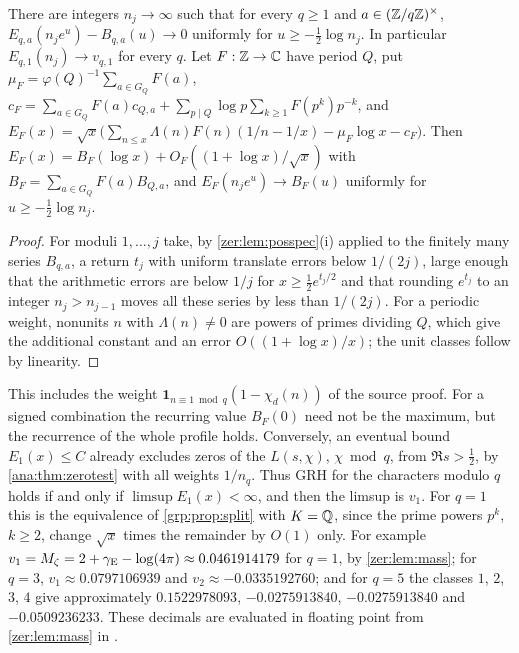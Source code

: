 \begin{theorem}\label{zer:thm:univpeak}
There are integers $n_j\to\infty$ such that for every $q\ge1$ and $a\in(\mathbb{Z}/q\mathbb{Z})^\times$,
$E_{q,a}(n_je^u)-B_{q,a}(u)\to0$ uniformly for $u\ge-\tfrac12\log n_j$. In particular
$E_{q,1}(n_j)\to v_{q,1}$ for every $q$. Let $F:\mathbb{Z}\to\mathbb{C}$ have period $Q$, put
$\mu_F=\varphi(Q)^{-1}\sum_{a\in G_Q}F(a)$,
$c_F=\sum_{a\in G_Q}F(a)c_{Q,a}+\sum_{p\mid Q}\log p\sum_{k\ge1}F(p^k)p^{-k}$, and
$E_F(x)=\sqrt x\bigl(\sum_{n\le x}\Lambda(n)F(n)(1/n-1/x)-\mu_F\log x-c_F\bigr)$. Then
$E_F(x)=B_F(\log x)+O_{F}((1+\log x)/\sqrt x)$ with $B_F=\sum_{a\in G_Q}F(a)B_{Q,a}$, and
$E_F(n_je^u)\to B_F(u)$ uniformly for $u\ge-\tfrac12\log n_j$.
\end{theorem}
\begin{proof}
For moduli $1,\dots,j$ take, by \cref{zer:lem:posspec}(i) applied to the finitely many series
$B_{q,a}$, a return $t_j$ with uniform translate errors below $1/(2j)$, large enough that the
arithmetic errors are below $1/j$ for $x\ge\tfrac12e^{t_j/2}$ and that rounding $e^{t_j}$ to an
integer $n_j>n_{j-1}$ moves all these series by less than $1/(2j)$. For a periodic weight,
nonunits $n$ with $\Lambda(n)\ne0$ are powers of primes dividing $Q$, which give the additional
constant and an error $O((1+\log x)/x)$; the unit classes follow by linearity.
\end{proof}

This includes the weight $\mathbf 1_{n\equiv1\bmod q}(1-\chi_d(n))$ of the source proof. For a signed
combination the recurring value $B_F(0)$ need not be the maximum, but the recurrence of the
whole profile holds. Conversely, an eventual bound $E_1(x)\le C$ already excludes zeros of the
$L(s,\chi)$, $\chi\bmod q$, from $\Re s>\tfrac12$, by \cref{ana:thm:zerotest} with all weights
$1/n_q$. Thus GRH for the characters modulo $q$ holds if and only if $\limsup E_1(x)<\infty$, and
then the limsup is $v_1$. For $q=1$ this is the equivalence of \cref{grp:prop:split} with $K=\mathbb{Q}$,
since the prime powers $p^k$, $k\ge2$, change $\sqrt x$ times the remainder by $O(1)$ only. For
example $v_1=M_\zeta=2+\gamma_{\mathrm{E}}-\log(4\pi)\approx0.0461914179$ for $q=1$, by \cref{zer:lem:mass}; for $q=3$,
$v_1\approx0.0797106939$ and $v_2\approx-0.0335192760$; and for $q=5$ the classes $1$, $2$,
$3$, $4$ give approximately $0.1522978093$, $-0.0275913840$, $-0.0275913840$ and
$-0.0509236233$. These decimals are
evaluated in floating point from \cref{zer:lem:mass} in .

